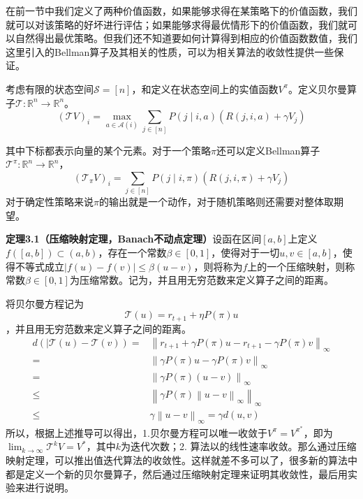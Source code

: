 \documentclass[a4paper]{article}
\begin{document}
在前一节中我们定义了两种价值函数，如果能够求得在某策略下的价值函数，我们就可以对该策略的好坏进行评估；如果能够求得最优情形下的价值函数，我们就可以自然得出最优策略。但我们还不知道要如何计算得到相应的价值函数数值，我们这里引入的Bellman算子及其相关的性质，可以为相关算法的收敛性提供一些保证。

考虑有限的状态空间$\mathcal{S} = [n]$，和定义在状态空间上的实值函数$V^\pi$。定义贝尔曼算子$\mathcal{T}:\mathbb{R}^n \to\mathbb{R}^n$。
\begin{equation}(\mathcal{T} V)_{i}=\max _{a \in \mathcal{A}(i)} \sum_{j \in[n]} P(j \mid i, a)\left(R(j, i, a)+\gamma V_{j}\right)\end{equation}

其中下标都表示向量的某个元素。对于一个策略$\pi$还可以定义Bellman算子$\mathcal{T}^\pi:\mathbb{R}^n \to\mathbb{R}^n$，
\begin{equation}\left(\mathcal{T}_{\pi} V\right)_{i}=\sum_{j \in[n]} P(j \mid i, \pi)\left(R(j, i, \pi)+\gamma V_{j}\right)\end{equation}
对于确定性策略来说$\pi$的输出就是一个动作，对于随机策略则还需要对整体取期望。

\textbf{定理3.1（压缩映射定理，Banach不动点定理）}设函在区间$[a,b]$上定义$f([a,b])\subset (a,b)$，存在一个常数$\beta \in [0,1]$，使得对于一切$u,v \in [a,b]$，使得不等式成立$|f(u)-f(v)|\leq \beta(u-v)$，则将称为$f$上的一个压缩映射，则称常数$\beta \in [0,1]$为压缩常数。记为，并且用无穷范数来定义算子之间的距离。

将贝尔曼方程记为$$\mathcal{T}(u)=r_{t+1}+\eta P(\pi) u$$，并且用无穷范数来定义算子之间的距离。
\begin{equation}
    \begin{aligned}
d\left(|\mathcal{T}(u) - \mathcal{T}(v)\right) = & \left\|r_{t+1}+\gamma P(\pi) u - r_{t+1} - \gamma P(\pi) v \right\|_\infty \\
= & \left\|\gamma P(\pi) u - \gamma P(\pi) v \right\|_\infty \\
= & \left\|\gamma P(\pi) ( u - v ) \right\|_\infty \\ 
\leq &  \left\|\gamma P(\pi) \left\| u - v \right\|_\infty \right\|_\infty \\
\leq & \gamma \left\| u - v \right\|_\infty = \gamma d(u,v)
\end{aligned}
\end{equation}
所以，根据上述推导可以得出，1.贝尔曼方程可以唯一收敛于$V^\pi=V^{\pi^\ast}$，即为$\lim _{k \rightarrow \infty} \mathcal{T}^{k} V=V^{*}$，其中$k$为迭代次数；2. 算法以的线性速率收敛。那么通过压缩映射定理，可以推出值迭代算法的收敛性。这样就差不多可以了，很多新的算法中都是定义一个新的贝尔曼算子，然后通过压缩映射定理来证明其收敛性，最后用实验来进行说明。
\end{document}
